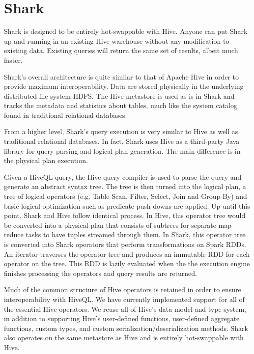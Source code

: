 \documentclass[preprint]{acm_proc_article-sp}
\begin{document}
\section{Shark}
Shark is designed to be entirely hot-swappable with Hive. Anyone can put Shark up and running in an existing Hive warehouse without any modification to existing data. Existing queries will return the same set of results, albeit much faster.

Shark's overall architecture is quite similar to that of Apache Hive in order to provide maximum interoperability. Data are stored physically in the underlying distributed file system HDFS. The Hive metastore is used as is in Shark and tracks the metadata and statistics about tables, much like the system catalog found in traditional relational databases. 

From a higher level, Shark's query execution is very similar to Hive as well as traditional relational databases. In fact, Shark uses Hive as a third-party Java library for query parsing and logical plan generation. The main difference is in the physical plan execution.

Given a HiveQL query, the Hive query compiler is used to parse the query and generate an abstract syntax tree. The tree is then turned into the logical plan, a tree of logical operators (e.g. Table Scan, Filter, Select, Join and Group-By) and basic logical optimization such as predicate push downs are applied. Up until this point, Shark and Hive follow identical process. In Hive, this operator tree would be converted into a physical plan that consists of subtrees for separate map reduce tasks to have tuples streamed through them. In Shark, this operator tree is converted into Shark operators that perform transformations on Spark RDDs. An iterator traverses the operator tree and produces an immutable RDD for each operator on the tree. This RDD is lazily evaluated when the the execution engine finishes processing the operators and query results are returned. 

Much of the common structure of Hive operators is retained in order to ensure interoperability with HiveQL. We have currently implemented support for all of the essential Hive operators. We reuse all of Hive's data model and type system, in addition to supporting Hive's user-defined functions, user-defined aggregate functions, custom types, and custom serialization/deserialization methods. Shark also operates on the same metastore as Hive and is entirely hot-swappable with Hive.
\end{document}
